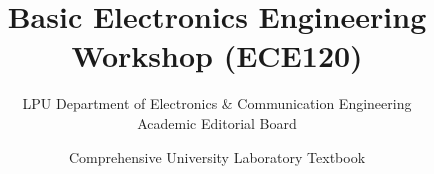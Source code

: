 \documentclass[a4paper,11pt,oneside,openany]{book}
\title{Basic Electronics Engineering Workshop (ECE120)}
\author{LPU Department of Electronics \& Communication Engineering\\Academic Editorial Board}
\date{Comprehensive University Laboratory Textbook}
\begin{document}
\frontmatter

\makebookcover
\copyrightpage
\disclaimerpage

\tableofcontents
\newpage

\mainmatter







\end{document}
